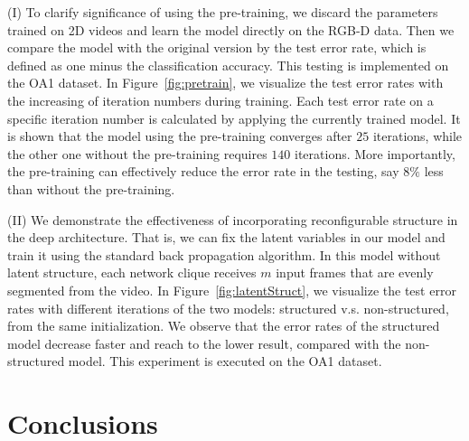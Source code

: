 \documentclass{sig-alternate}
\begin{document}
(I) To clarify significance of using the pre-training, we discard the parameters trained on 2D videos and learn the model directly on the RGB-D data. Then we compare the model with the original version by the test error rate, which is defined as one minus the classification accuracy. This testing is implemented on the OA1 dataset. In Figure~\ref{fig:pretrain}, we visualize the test error rates with the increasing of iteration numbers during training.  Each test error rate on a specific iteration number is calculated by applying the currently trained model. It is shown that the model using the pre-training converges after $25$ iterations, while the other one without the pre-training requires $140$ iterations. More importantly, the pre-training can effectively reduce the error rate in the testing, say $8\%$ less than without the pre-training.

(II) We demonstrate the effectiveness of incorporating reconfigurable structure in the deep architecture. That is, we can fix the latent variables in our model and train it using the standard back propagation algorithm. In this model without latent structure, each network clique receives $m$ input frames that are evenly segmented from the video. In Figure~\ref{fig:latentStruct}, we visualize the test error rates with different iterations of the two models: structured v.s. non-structured, from the same initialization. We observe that the error rates of the structured model decrease faster and reach to the lower result, compared with the non-structured model. This experiment is executed on the OA1 dataset.

\section{Conclusions}
\end{document}
